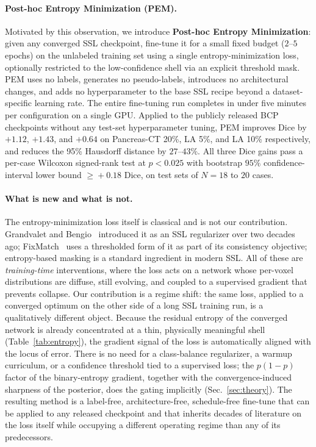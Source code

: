 \paragraph{Post-hoc Entropy Minimization (PEM).}
Motivated by this observation, we introduce \textbf{Post-hoc Entropy Minimization}: given any converged SSL checkpoint, fine-tune it for a small fixed budget ($2$--$5$ epochs) on the unlabeled training set using a single entropy-minimization loss, optionally restricted to the low-confidence shell via an explicit threshold mask. PEM uses no labels, generates no pseudo-labels, introduces no architectural changes, and adds no hyperparameter to the base SSL recipe beyond a dataset-specific learning rate. The entire fine-tuning run completes in under five minutes per configuration on a single GPU. Applied to the publicly released BCP checkpoints without any test-set hyperparameter tuning, PEM improves Dice by $+1.12$, $+1.43$, and $+0.64$ on Pancreas-CT 20\%, LA 5\%, and LA 10\% respectively, and reduces the 95\% Hausdorff distance by $27$--$43\%$. All three Dice gains pass a per-case Wilcoxon signed-rank test at $p<0.025$ with bootstrap $95\%$ confidence-interval lower bound $\geq\!+0.18$ Dice, on test sets of $N\!=\!18$ to $20$ cases.

\paragraph{What is new and what is not.}
The entropy-minimization loss itself is classical and is not our contribution. Grandvalet and Bengio~\cite{grandvalet2004entropy} introduced it as an SSL regularizer over two decades ago; FixMatch~\cite{sohn2020fixmatch} uses a thresholded form of it as part of its consistency objective; entropy-based masking is a standard ingredient in modern SSL. All of these are \emph{training-time} interventions, where the loss acts on a network whose per-voxel distributions are diffuse, still evolving, and coupled to a supervised gradient that prevents collapse. Our contribution is a regime shift: the same loss, applied to a converged optimum on the other side of a long SSL training run, is a qualitatively different object. Because the residual entropy of the converged network is already concentrated at a thin, physically meaningful shell (Table~\ref{tab:entropy}), the gradient signal of the loss is automatically aligned with the locus of error. There is no need for a class-balance regularizer, a warmup curriculum, or a confidence threshold tied to a supervised loss; the $p(1{-}p)$ factor of the binary-entropy gradient, together with the convergence-induced sharpness of the posterior, does the gating implicitly (Sec.~\ref{sec:theory}). The resulting method is a label-free, architecture-free, schedule-free fine-tune that can be applied to any released checkpoint and that inherits decades of literature on the loss itself while occupying a different operating regime than any of its predecessors.

